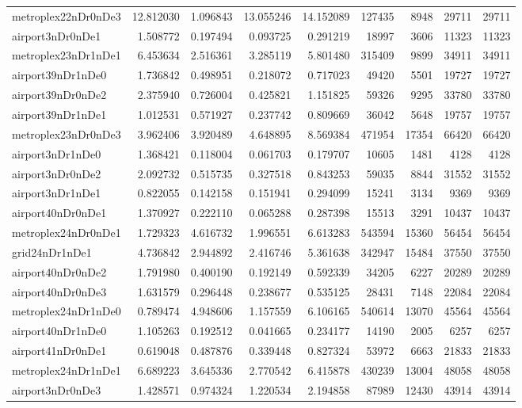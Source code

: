 \begin{longtable}{|l|r|r|r|r|r|r|r|r|}
metroplex22nDr0nDe3 & 12.812030 & 1.096843 & 13.055246 & 14.152089 & 127435 & 8948 & 29711 & 29711 \\
airport3nDr0nDe1 & 1.508772 & 0.197494 & 0.093725 & 0.291219 & 18997 & 3606 & 11323 & 11323 \\
metroplex23nDr1nDe1 & 6.453634 & 2.516361 & 3.285119 & 5.801480 & 315409 & 9899 & 34911 & 34911 \\
airport39nDr1nDe0 & 1.736842 & 0.498951 & 0.218072 & 0.717023 & 49420 & 5501 & 19727 & 19727 \\
airport39nDr0nDe2 & 2.375940 & 0.726004 & 0.425821 & 1.151825 & 59326 & 9295 & 33780 & 33780 \\
airport39nDr1nDe1 & 1.012531 & 0.571927 & 0.237742 & 0.809669 & 36042 & 5648 & 19757 & 19757 \\
metroplex23nDr0nDe3 & 3.962406 & 3.920489 & 4.648895 & 8.569384 & 471954 & 17354 & 66420 & 66420 \\
airport3nDr1nDe0 & 1.368421 & 0.118004 & 0.061703 & 0.179707 & 10605 & 1481 & 4128 & 4128 \\
airport3nDr0nDe2 & 2.092732 & 0.515735 & 0.327518 & 0.843253 & 59035 & 8844 & 31552 & 31552 \\
airport3nDr1nDe1 & 0.822055 & 0.142158 & 0.151941 & 0.294099 & 15241 & 3134 & 9369 & 9369 \\
airport40nDr0nDe1 & 1.370927 & 0.222110 & 0.065288 & 0.287398 & 15513 & 3291 & 10437 & 10437 \\
metroplex24nDr0nDe1 & 1.729323 & 4.616732 & 1.996551 & 6.613283 & 543594 & 15360 & 56454 & 56454 \\
grid24nDr1nDe1 & 4.736842 & 2.944892 & 2.416746 & 5.361638 & 342947 & 15484 & 37550 & 37550 \\
airport40nDr0nDe2 & 1.791980 & 0.400190 & 0.192149 & 0.592339 & 34205 & 6227 & 20289 & 20289 \\
airport40nDr0nDe3 & 1.631579 & 0.296448 & 0.238677 & 0.535125 & 28431 & 7148 & 22084 & 22084 \\
metroplex24nDr1nDe0 & 0.789474 & 4.948606 & 1.157559 & 6.106165 & 540614 & 13070 & 45564 & 45564 \\
airport40nDr1nDe0 & 1.105263 & 0.192512 & 0.041665 & 0.234177 & 14190 & 2005 & 6257 & 6257 \\
airport41nDr0nDe1 & 0.619048 & 0.487876 & 0.339448 & 0.827324 & 53972 & 6663 & 21833 & 21833 \\
metroplex24nDr1nDe1 & 6.689223 & 3.645336 & 2.770542 & 6.415878 & 430239 & 13004 & 48058 & 48058 \\
airport3nDr0nDe3 & 1.428571 & 0.974324 & 1.220534 & 2.194858 & 87989 & 12430 & 43914 & 43914 \\

\end{longtable}
